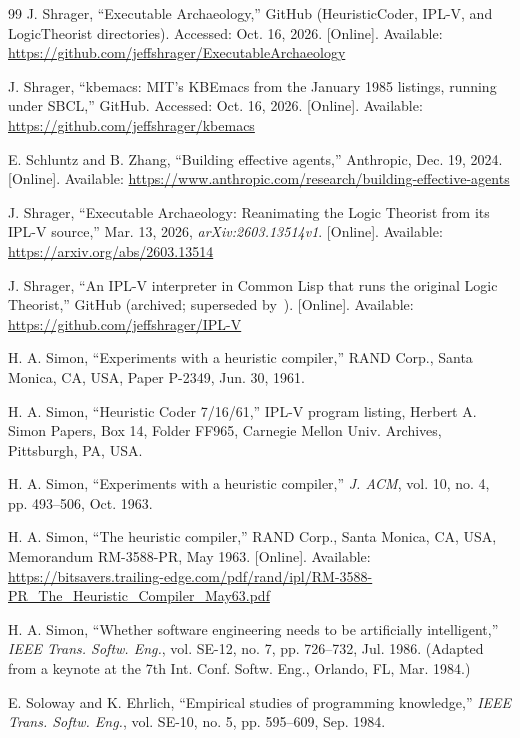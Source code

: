 \documentclass[11pt]{article}
\begin{document}
\begin{thebibliography}{99}
 J. Shrager, ``Executable Archaeology,'' GitHub
  (HeuristicCoder, IPL-V, and LogicTheorist directories). Accessed:
  Oct. 16, 2026. [Online]. Available:
  \url{https://github.com/jeffshrager/ExecutableArchaeology}

 J. Shrager, ``kbemacs: MIT's KBEmacs from the
  January 1985 listings, running under SBCL,'' GitHub. Accessed:
  Oct. 16, 2026. [Online]. Available:
  \url{https://github.com/jeffshrager/kbemacs}

 E. Schluntz and B. Zhang, ``Building
  effective agents,'' Anthropic, Dec. 19, 2024. [Online]. Available:
  \url{https://www.anthropic.com/research/building-effective-agents}

 J. Shrager,
  ``Executable Archaeology: Reanimating the Logic Theorist
  from its IPL-V source,''
  Mar. 13, 2026, \textit{arXiv:2603.13514v1}. [Online]. Available:
  \url{https://arxiv.org/abs/2603.13514}

 J. Shrager, ``An IPL-V interpreter in Common Lisp
  that runs the original Logic Theorist,'' GitHub (archived; superseded
  by~\cite{earepo}). [Online]. Available:
  \url{https://github.com/jeffshrager/IPL-V}

 H. A. Simon, ``Experiments with a heuristic
  compiler,'' RAND Corp., Santa Monica, CA, USA, Paper P-2349, Jun. 30,
  1961.

 H. A. Simon, ``Heuristic Coder 7/16/61,''
  IPL-V program listing, Herbert A. Simon Papers, Box 14, Folder FF965,
  Carnegie Mellon Univ. Archives, Pittsburgh, PA, USA.

 H. A. Simon, ``Experiments with a heuristic
  compiler,'' \textit{J. ACM}, vol. 10, no. 4, pp. 493--506, Oct. 1963.

 H. A. Simon, ``The heuristic compiler,'' RAND
  Corp., Santa Monica, CA, USA, Memorandum RM-3588-PR, May 1963.
  [Online]. Available:
  \url{https://bitsavers.trailing-edge.com/pdf/rand/ipl/RM-3588-PR_The_Heuristic_Compiler_May63.pdf}

 H. A. Simon, ``Whether software engineering
  needs to be artificially intelligent,'' \textit{IEEE Trans. Softw.
  Eng.}, vol. SE-12, no. 7, pp. 726--732, Jul. 1986. (Adapted from a
  keynote at the 7th Int. Conf. Softw. Eng., Orlando, FL, Mar. 1984.)

 E. Soloway and K. Ehrlich, ``Empirical studies of
  programming knowledge,'' \textit{IEEE Trans. Softw. Eng.}, vol. SE-10,
  no. 5, pp. 595--609, Sep. 1984.


\end{thebibliography}
\end{document}
